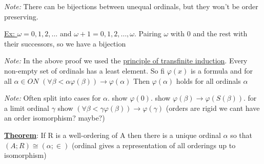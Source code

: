 \documentclass{article}
\begin{document}
    \emph{Note: } There can be bijections between unequal ordinals, but they won't be order preserving.

    \underline{Ex: } $\omega = 0,1,2,\dots$ and $\omega + 1 = 0,1,2,\dots,\omega$.
    Pairing $\omega$ with 0 and the rest with their successors, so we have a bijection

    \emph{Note: } In the above proof we used the \underline{principle of transfinite induction}.
    Every non-empty set of ordinals has a least element.
    So fi $\varphi(x)$ is a formula and for all $\alpha \in ON$
    $(\forall \beta < \alpha \varphi(\beta)) \rightarrow \varphi(\alpha)$
    Then $\varphi(\alpha)$ holds for all ordinals $\alpha$

    \emph{Note: } Often split into cases for $\alpha$.
    show $\varphi(0)$.
    show $\varphi(\beta) \rightarrow \varphi(S(\beta))$.
    for a limit ordinal $\gamma$ show $(\forall \beta < \gamma \varphi(\beta)) \rightarrow \varphi(\gamma)$
    (orders are rigid we cant have an order isomorphism? maybe?)

    \underline{\textbf{Theorem}}: If R is a well-ordering of A then there is a unique ordinal $\alpha$ so that $(A;R) \cong (\alpha;\in)$
    (ordinal gives a representation of all orderings up to isomorphism)
\end{document}
